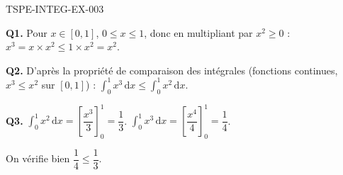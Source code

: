\begin{corrige}{TSPE-INTEG-EX-003}

\textbf{Q1.} Pour $x \in [0,1]$, $0 \leq x \leq 1$, donc en multipliant par $x^2 \geq 0$ : $x^3 = x \times x^2 \leq 1 \times x^2 = x^2$.

\textbf{Q2.} D'après la propriété de comparaison des intégrales (fonctions continues, $x^3 \leq x^2$ sur $[0,1]$) : $\displaystyle\int_0^1 x^3\,\mathrm{d}x \leq \int_0^1 x^2\,\mathrm{d}x$.

\textbf{Q3.} $\displaystyle\int_0^1 x^2\,\mathrm{d}x = \left[\dfrac{x^3}{3}\right]_0^1 = \dfrac{1}{3}$. $\displaystyle\int_0^1 x^3\,\mathrm{d}x = \left[\dfrac{x^4}{4}\right]_0^1 = \dfrac{1}{4}$.

On vérifie bien $\dfrac{1}{4} \leq \dfrac{1}{3}$.

\end{corrige}
